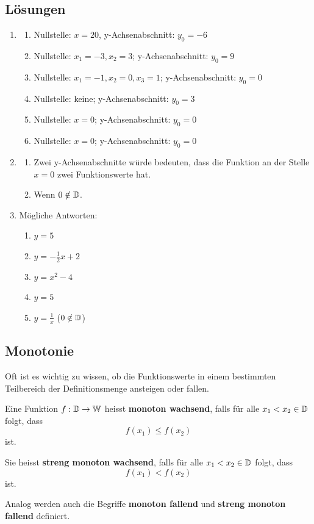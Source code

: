 \subsection{Lösungen}
\begin{enumerate}
    \item \begin{enumerate}
              \item Nullstelle: \(x = 20\), y-Achsenabschnitt: \(y_0 = -6\)
              \item Nullstelle: \(x_1 = -3, x_2 = 3\); y-Achsenabschnitt: \(y_0 = 9\)
              \item Nullstelle: \(x_1 = -1, x_2 = 0, x_3 = 1\); y-Achsenabschnitt: \(y_0 = 0\)
              \item Nullstelle: keine; y-Achsenabschnitt: \(y_0 = 3\)
              \item Nullstelle: \(x=0\); y-Achsenabschnitt: \(y_0 = 0\)
              \item Nullstelle: \(x=0\); y-Achsenabschnitt: \(y_0 = 0\)
          \end{enumerate}
    \item \begin{enumerate}
              \item Zwei y-Achsenabschnitte würde bedeuten, dass die Funktion an der Stelle $x=0$ zwei Funktionswerte hat.
              \item Wenn $0 \notin \operatorname{\mathbb{D}}$.
          \end{enumerate}
    \item Mögliche Antworten:
          \begin{enumerate}
              \item \(y = 5\)
              \item \(y = -\tfrac{1}{2}x + 2\)
              \item \(y = x^2 - 4\)
              \item \(y = 5\)
              \item \(y = \tfrac{1}{x}\) ($0 \notin \operatorname{\mathbb{D}}$)
          \end{enumerate}
\end{enumerate}
\newpage
\subsection{Monotonie}
Oft ist es wichtig zu wissen, ob die Funktionswerte in einem bestimmten Teilbereich der Definitionsmenge ansteigen oder fallen.
\begin{deff}[Monotonie]{}
    Eine Funktion \( f : \operatorname{\mathbb{D}} \to \operatorname{\mathbb{W}} \) heisst \textbf{monoton wachsend}, falls für alle \( x_1 < x_2 \in \operatorname{\mathbb{D}} \) folgt, dass
    \[
        f(x_1) \le f(x_2)
    \]
    ist.

    Sie heisst \textbf{streng monoton wachsend}, falls für alle \( x_1 < x_2 \in \operatorname{\mathbb{D}} \) folgt, dass
    \[
        f(x_1) < f(x_2)
    \]
    ist.

    \medskip

    Analog werden auch die Begriffe \textbf{monoton fallend} und \textbf{streng monoton fallend} definiert.
\end{deff}

